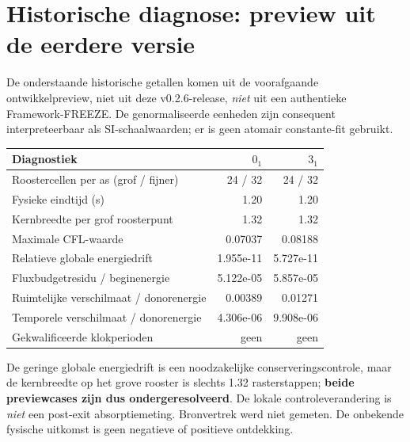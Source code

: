 \documentclass[10pt,a4paper]{article}
\begin{document}
\section{Historische diagnose: preview uit de eerdere versie}
De onderstaande historische getallen komen uit de voorafgaande ontwikkelpreview, niet uit deze v0.2.6-release, \emph{niet} uit een authentieke Framework-FREEZE. De genormaliseerde eenheden zijn consequent interpreteerbaar als SI-schaalwaarden; er is geen atomair constante-fit gebruikt.
\begin{center}\begin{tabular}{lrr}\toprule
Diagnostiek & $0_1$ & $3_1$\\\midrule
Roostercellen per as (grof / fijner) & 24 / 32 & 24 / 32\\
Fysieke eindtijd (s) & 1.20 & 1.20\\
Kernbreedte per grof roosterpunt & 1.32 & 1.32\\
Maximale CFL-waarde & 0.07037 & 0.08188\\
Relatieve globale energiedrift & 1.955e-11 & 5.727e-11\\
Fluxbudgetresidu / beginenergie & 5.122e-05 & 5.857e-05\\
Ruimtelijke verschilmaat / donorenergie & 0.00389 & 0.01271\\
Temporele verschilmaat / donorenergie & 4.306e-06 & 9.908e-06\\
Gekwalificeerde klokperioden & geen & geen\\\bottomrule
\end{tabular}\end{center}
De geringe globale energiedrift is een noodzakelijke conserveringscontrole, maar de kernbreedte op het grove rooster is slechts 1.32 rasterstappen; \textbf{beide previewcases zijn dus ondergeresolveerd}. De lokale controleverandering is \emph{niet} een post-exit absorptiemeting. Bronvertrek werd niet gemeten. De onbekende fysische uitkomst is geen negatieve of positieve ontdekking.
\end{document}
